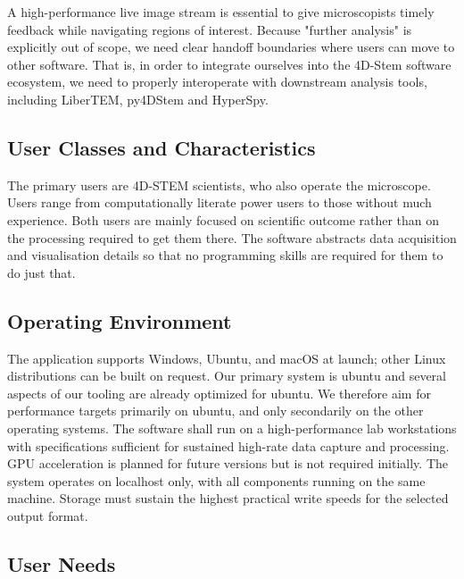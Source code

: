 \documentclass[10pt]{article}
\begin{document}
    A high-performance live image stream is essential to give microscopists timely feedback while navigating regions of interest. Because "further analysis" is explicitly out of scope, we need clear handoff boundaries where users can move to other software. That is, in order to integrate ourselves into the 4D-Stem software ecosystem, we need to properly interoperate with downstream analysis tools, including LiberTEM, py4DStem and HyperSpy.

    \subsection{User Classes and Characteristics}\label{subsec:user-classes-and-characteristics}
    The primary users are 4D-STEM scientists, who also operate the microscope. Users range from computationally literate power users to those without much experience. Both users are mainly focused on scientific outcome rather than on the processing required to get them there. The software abstracts data acquisition and visualisation details so that no programming skills are required for them to do just that.

    \subsection{Operating Environment}\label{subsec:operating-environment}
    The application supports Windows, Ubuntu, and macOS at launch; other Linux distributions can be built on request. Our primary system is ubuntu and several aspects of our tooling are already optimized for ubuntu. We therefore aim for performance targets primarily on ubuntu, and only secondarily on the other operating systems. The software shall run on a high-performance lab workstations with specifications sufficient for sustained high-rate data capture and processing. GPU acceleration is planned for future versions but is not required initially. The system operates on localhost only, with all components running on the same machine. Storage must sustain the highest practical write speeds for the selected output format.

    \subsection{User Needs}
\end{document}
